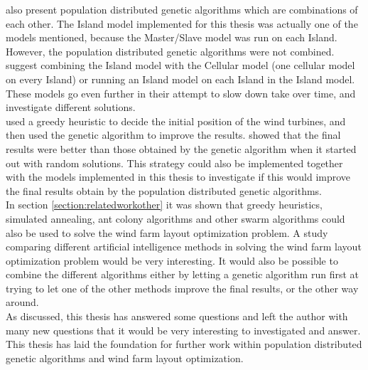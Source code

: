 \noindent \citep{Gong} also present population distributed genetic algorithms which are combinations of each other. The Island model implemented for this thesis was actually one of the models mentioned, because the Master/Slave model was run on each Island. However, the population distributed genetic algorithms were not combined. \citep{Gong} suggest combining the Island model with the Cellular model (one cellular model on every Island) or running an Island model on each Island in the Island model. These models go even further in their attempt to slow down take over time, and investigate different solutions.\\


\noindent \citep{Saavedra-Morena} used a greedy heuristic to decide the initial position of the wind turbines, and then used the genetic algorithm to improve the results. \citep{Saavedra-Morena} showed that the final results were better than those obtained by the genetic algorithm when it started out with random solutions. This strategy could also be implemented together with the models implemented in this thesis to investigate if this would improve the final results obtain by the population distributed genetic algorithms. \\


\noindent In section \ref{section:relatedworkother} it was shown that greedy heuristics, simulated annealing, ant colony algorithms and other swarm algorithms could also be used to solve the wind farm layout optimization problem. A study comparing different artificial intelligence methods in solving the wind farm layout optimization problem would be very interesting. It would also be possible to combine the different algorithms either by letting a genetic algorithm run first at trying to let one of the other methods improve the final results, or the other way around. \\

\noindent As discussed, this thesis has answered some questions and left the author with many new questions that it would be very interesting to investigated and answer. This thesis has laid the foundation for further work within population distributed genetic algorithms and wind farm layout optimization.\\